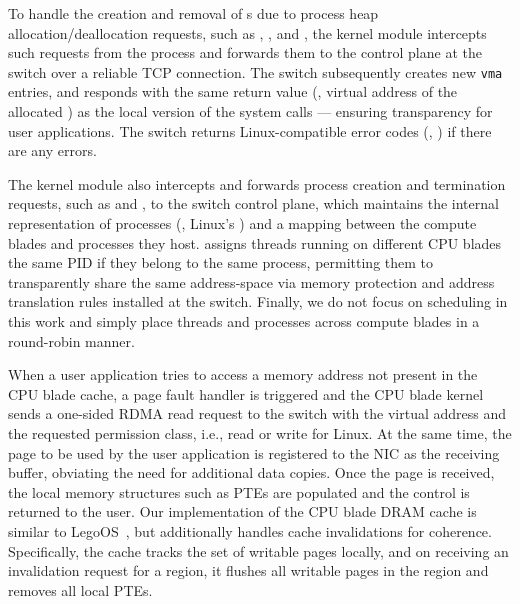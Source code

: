  To handle the creation and removal of s due to process heap allocation/deallocation requests, such as , , and , the kernel module intercepts such requests from the process and forwards them to the control plane at the switch over a reliable TCP connection. The switch subsequently creates new \texttt{vma} entries, and responds with the same return value (\eg, virtual address of the allocated ) as the local version of the system calls --- ensuring transparency for user applications. The switch returns Linux-compatible error codes (\eg, ) if there are any errors.

 The kernel module also intercepts and forwards process creation and termination requests, such as  and , to the switch control plane, which maintains the internal representation of processes (\ie, Linux's ) and a mapping between the compute blades and processes they host. \mind assigns threads running on different CPU blades the same PID if they belong to the same process, permitting them to transparently share the same address-space via memory protection and address translation rules installed at the switch. Finally, we do not focus on scheduling in this work and simply place threads and processes across compute blades in a round-robin manner.

 When a user application tries to access a memory address not present in the CPU blade cache, a page fault handler is triggered and the CPU blade kernel sends a one-sided RDMA read request to the switch with the virtual address and the requested permission class, i.e., read or write for Linux. At the same time, the page to be used by the user application is registered to the NIC as the receiving buffer, obviating the need for additional data copies. Once the page is received, the local memory structures such as PTEs are populated and the control is returned to the user. Our implementation of the CPU blade DRAM cache is similar to LegoOS~\cite{legoos}, but additionally handles cache invalidations for coherence. Specifically, the cache tracks the set of writable pages locally, and on receiving an invalidation request for a region, it flushes all writable pages in the region and removes all local PTEs.

